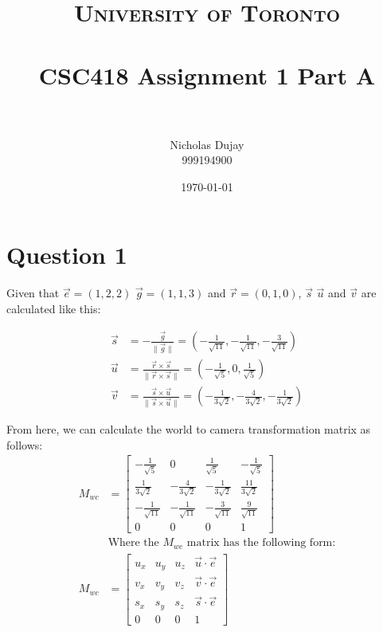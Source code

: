 \documentclass{article} %
\title{
\normalfont \normalsize
\textsc{University of Toronto} \\ [25pt] %
\horrule{0.5pt} \\[0.4cm] %
\huge CSC418 Assignment 1 Part A \\ %
\horrule{2pt} \\[0.5cm] %
}
\author{Nicholas Dujay\\999194900} %
\date{\normalsize\today} %
\begin{document}
\maketitle %


\section{Question 1}
Given that $\vec{e} = (1,2,2)$ $\vec{g} =(1,1,3)$ and $\vec{r}=(0,1,0)$, $\vec{s}$ $\vec{u}$ and $\vec{v}$ are calculated like this:

\begin{align*}
\vec{s}&=-\frac{\vec{g}}{\| \vec{g} \|} = \left(-\frac{1}{\sqrt{11}},-\frac{1}{\sqrt{11}},-\frac{3}{\sqrt{11}} \right) \\
\vec{u}&=\frac{\vec{r} \times \vec{s}}{\|\vec{r} \times \vec{s}\|} = \left(-\frac{1}{\sqrt{5}},0,\frac{1}{\sqrt{5}} \right)\\
\vec{v}&=\frac{\vec{s} \times \vec{u}}{\|\vec{s} \times \vec{u}\|} = \left(-\frac{1}{3\sqrt{2}},-\frac{4}{3\sqrt{2}},-\frac{1}{3\sqrt{2}} \right) 
\end{align*}

From here, we can calculate the world to camera transformation matrix as follows:
\begin{align*}
M_{wc} &= \left[
\begin{array}{ccc|c}
-\frac{1}{\sqrt{5}} & 0 & \frac{1}{\sqrt{5}} & -\frac{1}{\sqrt{5}}\\
\frac{1}{3\sqrt{2}} & -\frac{4}{3\sqrt{2}} & -\frac{1}{3\sqrt{2}} & \frac{11}{3\sqrt{2}}\\
-\frac{1}{\sqrt{11}} & -\frac{1}{\sqrt{11}} & -\frac{3}{\sqrt{11}} & \frac{9}{\sqrt{11}}\\
0 & 0 & 0 & 1
\end{array}
\right]\\
&\text{Where the $M_{wc}$ matrix has the following form:}\\
M_{wc} &= \left[
\begin{array}{ccc|c}
u_x & u_y & u_z & \vec{u} \cdot \vec{e} \\
v_x & v_y & v_z & \vec{v} \cdot \vec{e} \\
s_x & s_y & s_z & \vec{s} \cdot \vec{e} \\
0 & 0 & 0 & 1
\end{array}
\right]
\end{align*}
\end{document}

